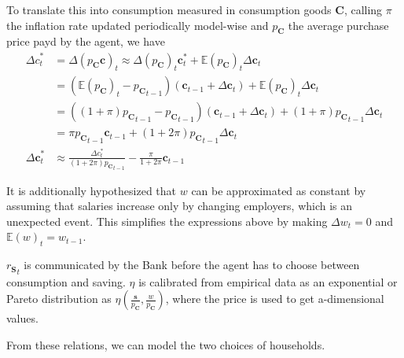 \documentclass[a4paper, headings=standardclasses]{scrartcl}
\begin{document}
To translate this into consumption measured in consumption goods $\mathbf{C}$, calling $\pi$ the inflation rate updated periodically model-wise and $p_\mathbf{C}$ the average purchase price payd by the agent, we have
\begin{align*}
	{\Delta c}^*_t          & = \Delta (p_\mathbf{C} \mathbf{c})_t \approx \Delta(p_\mathbf{C})_t \mathbf{c}^*_t + \mathbb{E}(p_\mathbf{C})_t {\Delta \mathbf{c}}_t                 \\
	                        & = (\mathbb{E}(p_\mathbf{C})_t - {p_\mathbf{C}}_{t-1}) (\mathbf{c}_{t-1} + {\Delta \mathbf{c}}_t) + \mathbb{E}(p_\mathbf{C})_t {\Delta \mathbf{c}}_t   \\
	                        & = ((1+\pi){p_\mathbf{C}}_{t-1} - {p_\mathbf{C}}_{t-1}) (\mathbf{c}_{t-1} + {\Delta \mathbf{c}}_t) + (1+\pi){p_\mathbf{C}}_{t-1} {\Delta \mathbf{c}}_t \\
	                        & = \pi {p_\mathbf{C}}_{t-1} \mathbf{c}_{t-1} + (1+2\pi){p_\mathbf{C}}_{t-1} {\Delta \mathbf{c}}_t                                                      \\
	{\Delta \mathbf{c}}^*_t & \approx \frac{\Delta c^*_t}{(1+2\pi){p_\mathbf{C}}_{t-1}} - \frac{\pi}{1+2\pi}{\mathbf{c}_{t-1}}
\end{align*}

It is additionally hypothesized that $w$ can be approximated as constant by assuming that salaries increase only by changing employers, which is an unexpected event. This simplifies the expressions above by making ${\Delta w}_t = 0$ and ${\mathbb{E}(w)}_t = w_{t-1}$.

${r_\mathbf{S}}_t$ is communicated by the Bank before the agent has to choose between consumption and saving. $\eta$ is calibrated from empirical data \parencite[such as][]{fisher2020,carroll2017} as an exponential or Pareto distribution as $\eta(\frac{\mathbf{s}}{p_\mathbf{C}},\frac{w}{p_\mathbf{C}})$, where the price is used to get a-dimensional values.

From these relations, we can model the two choices of households.
\end{document}
